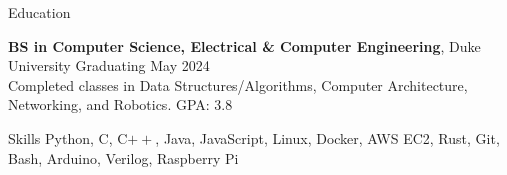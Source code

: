 \documentclass{resume}
\begin{document}






\begin{rSection}{Education}

\textbf{BS in Computer Science, Electrical \& Computer Engineering}, Duke University \hfill {Graduating May 2024}\\
Completed classes in Data Structures/Algorithms, Computer Architecture, Networking, and Robotics. \hfill {GPA: 3.8}


\end{rSection}

\begin{rSection}{Skills}
    Python, C, C$++$, Java, JavaScript, Linux, Docker, AWS EC2, Rust, Git, Bash, Arduino, Verilog, Raspberry Pi
\end{rSection}

\end{document}
